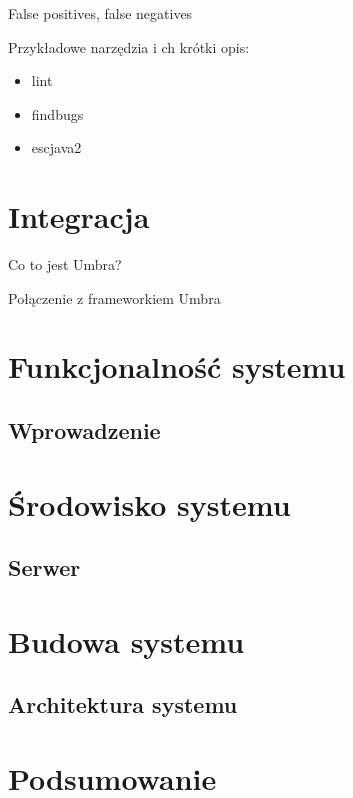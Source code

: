 \documentclass{pracamgr}
\begin{document}
    False positives, false negatives
    
    Przykładowe narzędzia i ch krótki opis:
    \begin{itemize}
        \item lint
        \item findbugs
        \item escjava2
    \end{itemize}
    
    
\chapter{Integracja}\label{r:integration}

    Co to jest Umbra?

    Połączenie z frameworkiem Umbra

\chapter{Funkcjonalność systemu}\label{r:funkcjonalnosc}

\section{Wprowadzenie}


\chapter{Środowisko systemu}\label{r:srodowisko}

\section{Serwer}


\chapter{Budowa systemu}\label{r:budowa}

\section{Architektura systemu}




\chapter{Podsumowanie}\label{r:podsumowanie}


\appendix
\end{document}

